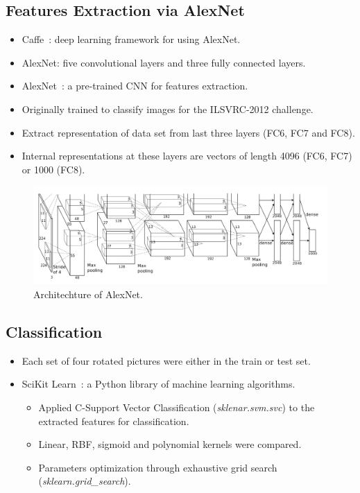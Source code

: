 \documentclass{article} %
\begin{document}
 
\subsection{Features Extraction via AlexNet}
\begin{itemize}
  \item Caffe~\citep{jia2014caffe}: deep learning framework for using AlexNet. 
\item AlexNet: five convolutional layers and three fully connected layers.

 \item AlexNet~\citep{krizhevsky2012imagenet}: a pre-trained CNN for features extraction.

\item Originally trained to classify images for the ILSVRC-2012 challenge. 
\item Extract representation of data set from last three layers (FC6, FC7 and FC8). 
\item Internal representations at these layers are vectors of length 4096 (FC6, FC7) or 1000 (FC8). 
\end{itemize}

\begin{figure}[h]
\centering
\includegraphics[width=\textwidth]{alexnet.png}
\caption{Architechture of AlexNet.}
\label{fig:alexnet}
\end{figure}

\subsection{Classification}
 \begin{itemize}
  \item Each set of four rotated pictures were either in the train or test set. 
  \item SciKit Learn~\citep{scikit-learn}: a Python library of machine learning algorithms. 
 \begin{itemize}
 \item Applied C-Support Vector Classification (\emph{sklenar.svm.svc}) to the extracted features for classification. 
 \item Linear, RBF, sigmoid and polynomial kernels were compared. 
 \item Parameters optimization through exhaustive grid search (\emph{sklearn.grid\_search}).
 \end{itemize}
 \end{itemize}
 
\end{document}
